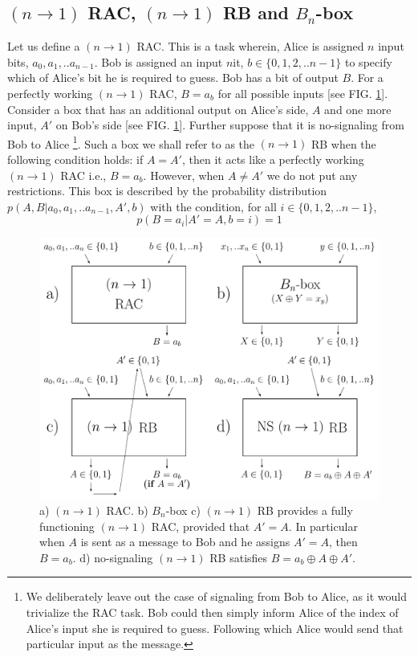 \documentclass[%
 reprint,
 amsmath,amssymb,
 aps,
]{revtex4-1}
\begin{document}
\subsection*{$(n\rightarrow1)$ RAC, $(n\rightarrow1)$ RB and $B_n$-box}
\noindent Let us define a {$(n\rightarrow1)$ RAC}. This is a {task} wherein, Alice is assigned $n$ input bits, $a_0,a_1,..a_{n-1}$. Bob is assigned an input $n$it, $b\in\{0,1,2,..n-1\}$ to specify which of Alice's bit he is required to guess. Bob has a bit of output $B$. For a perfectly working $(n\rightarrow1)$ RAC, $B=a_b$ for all possible inputs [see FIG. \ref{fig1}]. \\
Consider a box that has an additional output on Alice's side, $A$ and one more input, $A'$ on Bob's side [see FIG. \ref{fig1}]. Further suppose that it is no-signaling from Bob to Alice \footnote{We deliberately leave out the case of signaling from Bob to Alice, as it would trivialize the RAC task. Bob could then simply inform Alice of the index of Alice's input she is required to guess. Following which Alice would send that particular input as the message.}. Such a box we shall refer to as the $(n\rightarrow1)$ RB when the following condition holds: if $A=A'$, then it acts like a perfectly working $(n\rightarrow1)$ RAC i.e., $B=a_b$. However, when $A\neq A'$ we do not put any restrictions.  This box is described by the probability distribution $p(A,B|a_0,a_1,..a_{n-1},A',b)$ with the condition, for all $i\in\{0,1,2,..n-1\}$,
\begin{equation}\label{e1}
p(B=a_i|A'=A,b=i)=1
\end{equation}
\begin{figure}
\includegraphics[scale=0.5]{Def1.pdf}
\caption{  \label{fig1} a) $(n\rightarrow 1)$ RAC. b) $B_n$-box c) $(n\rightarrow 1)$ RB provides a fully functioning $(n\rightarrow 1)$ RAC, provided that $A'=A$. In particular when $A$ is sent as a message to Bob and he assigns $A'=A$, then $B=a_b$. d) no-signaling $(n\rightarrow 1)$ RB satisfies $B=a_b\oplus A \oplus A'$.}
\end{figure}
\end{document}
